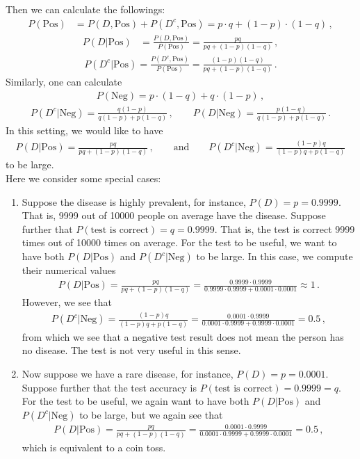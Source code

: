 \documentclass[11pt,oneside]{book}
\theoremstyle{newStyle}
\begin{document}
Then we can calculate the followings:
\begin{align*}
P(\text{Pos}) &= P(D, \text{Pos})+P(D^c, \text{Pos}) = p \cdot q + (1-p)\cdot (1-q)\,,
\end{align*}
\begin{align*}
P(D|\text{Pos}) &= \frac{P(D, \text{Pos})}{P(\text{Pos})} = \frac{pq}{pq+(1-p)(1-q)}\,, 
\end{align*}
\begin{align*}
P(D^c| \text{Pos}) = \frac{P(D^c, \text{Pos})}{P(\text{Pos})} = \frac{(1-p)(1-q)}{pq+(1-p)(1-q)}\,.
\end{align*}
Similarly, one can calculate
\begin{align*}
P(\text{Neg}) = p\cdot(1-q) + q\cdot (1-p)\,, 
\end{align*}
\begin{align*}
P(D^c|\text{Neg}) = \frac{q(1-p)}{q(1-p)+p(1-q)}\,,\qquad
P(D|\text{Neg}) = \frac{p(1-q)}{q(1-p) +p(1-q)}\,.
\end{align*}
In this setting, we would like to have 
\begin{align*}
P(D|\text{Pos}) = \frac{pq}{pq+(1-p)(1-q)}\,,\qquad
\text{and}\qquad P(D^c|\text{Neg}) = \frac{(1-p)q}{(1-p)q+p(1-q)}
\end{align*}
to be large.\\

Here we consider some special cases: 
\begin{enumerate}
\item Suppose the disease is highly prevalent, for instance, $P(D) = p = 0.9999$. That is, 9999 out of 10000 people on average have the disease. Suppose further that $P(\text{test is correct})= q = 0.9999$. That is, the test is correct 9999 times out of 10000 times on average. For the test to be useful, we want to have both $P(D|\text{Pos})$ and $P(D^c|\text{Neg})$ to be large. In this case, we compute their numerical values
\begin{align*}
P(D|\text{Pos}) = \frac{pq}{pq+(1-p)(1-q)}  = \frac{0.9999 \cdot 0.9999}{0.9999\cdot 0.9999 + 0.0001 \cdot 0.0001}\approx 1\,.
\end{align*}
However, we see that
\begin{align*}
P(D^c|\text{Neg}) = \frac{(1-p)q}{(1-p)q+p(1-q)} = \frac{0.0001 \cdot 0.9999}{0.0001\cdot 0.9999 + 0.9999\cdot 0.0001} = 0.5\,,
\end{align*}
from which we see that a negative test result does not mean the person has no disease. The test is not very useful in this sense. 
\item Now suppose we have a rare disease, for instance, $P(D) = p = 0.0001$. Suppose further that the test accuracy is $P(\text{test is correct}) = 0.9999=q$. For the test to be useful, we again want to have both $P(D|\text{Pos})$ and $P(D^c|\text{Neg})$ to be large, but we again see that 
\begin{align*}
P(D|\text{Pos}) = \frac{pq}{pq+(1-p)(1-q)} = \frac{0.0001\cdot 0.9999}{0.0001 \cdot 0.9999 + 0.9999 \cdot 0.0001} = 0.5\,,
\end{align*}
which is equivalent to a coin toss. 
\end{enumerate}
\end{document}
